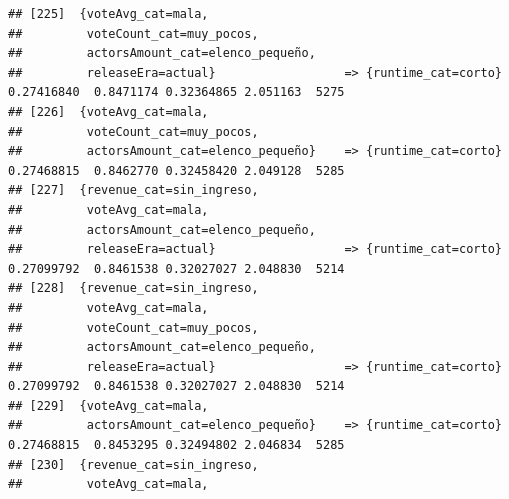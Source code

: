 \documentclass[
]{article}
\begin{document}
\begin{verbatim}
## [225]  {voteAvg_cat=mala,                                                                                                       
##         voteCount_cat=muy_pocos,                                                                                                
##         actorsAmount_cat=elenco_pequeño,                                                                                        
##         releaseEra=actual}                  => {runtime_cat=corto}               0.27416840  0.8471174 0.32364865 2.051163  5275
## [226]  {voteAvg_cat=mala,                                                                                                       
##         voteCount_cat=muy_pocos,                                                                                                
##         actorsAmount_cat=elenco_pequeño}    => {runtime_cat=corto}               0.27468815  0.8462770 0.32458420 2.049128  5285
## [227]  {revenue_cat=sin_ingreso,                                                                                                
##         voteAvg_cat=mala,                                                                                                       
##         actorsAmount_cat=elenco_pequeño,                                                                                        
##         releaseEra=actual}                  => {runtime_cat=corto}               0.27099792  0.8461538 0.32027027 2.048830  5214
## [228]  {revenue_cat=sin_ingreso,                                                                                                
##         voteAvg_cat=mala,                                                                                                       
##         voteCount_cat=muy_pocos,                                                                                                
##         actorsAmount_cat=elenco_pequeño,                                                                                        
##         releaseEra=actual}                  => {runtime_cat=corto}               0.27099792  0.8461538 0.32027027 2.048830  5214
## [229]  {voteAvg_cat=mala,                                                                                                       
##         actorsAmount_cat=elenco_pequeño}    => {runtime_cat=corto}               0.27468815  0.8453295 0.32494802 2.046834  5285
## [230]  {revenue_cat=sin_ingreso,                                                                                                
##         voteAvg_cat=mala,                                                                                                       

\end{verbatim}
\end{document}
